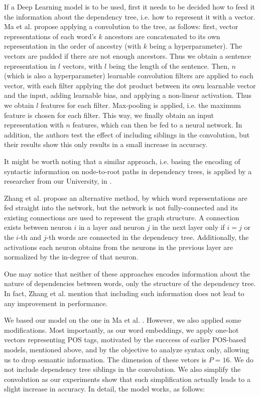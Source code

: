 \documentclass[twocolumn]{article}
\begin{document}
If a Deep Learning model is to be used, first it needs to be decided how to feed it the information about the dependency tree, i.e. how to represent it with a vector. Ma et al. \cite{ancestors} propose applying a convolution to the tree, as follows: first, vector representations of each word's $k$ ancestors are concatenated to its own representation in the order of ancestry (with $k$ being a hyperparameter). The vectors are padded if there are not enough ancestors. Thus we obtain a sentence representation in $l$ vectors, with $l$ being the length of the sentence. Then, $n$ (which is also a hyperparameter) learnable convolution filters are applied to each vector, with each filter applying the dot product between its own learnable vector and the input, adding learnable bias, and applying a non-linear activation. Thus we obtain $l$ features for each filter. Max-pooling is applied, i.e. the maximum feature is chosen for each filter. This way, we finally obtain an input representation with $n$ features, which can then be fed to a neural network. In addition, the authors test the effect of including siblings in the convolution, but their results show this only results in a small increase in accuracy.

It might be worth noting that a similar approach, i.e. basing the encoding of syntactic information on node-to-root paths in dependency trees, is applied by a researcher from our University, in \cite{kgan}.

Zhang et al. \cite{adjacency} propose an alternative method, by which word representations are fed straight into the network, but the network is not fully-connected and its existing connections are used to represent the graph structure. A connection exists between neuron $i$ in a layer and neuron $j$ in the next layer only if $i=j$ or the $i$-th and $j$-th words are connected in the dependency tree. Additionally, the activations each neuron obtains from the neurons in the previous layer are normalized by the in-degree of that neuron.

One may notice that neither of these approaches encodes information about the nature of dependencies between words, only the structure of the dependency tree. In fact, Zhang et al. mention that including such information does not lead to any improvement in performance.

We based our model on the one in Ma et al. \cite{ancestors}. However, we also applied some modifications. Most importantly, as our word embeddings, we apply one-hot vectors representing POS tags, motivated by the succcess of earlier POS-based models, mentioned above, and by the objective to analyze syntax only, allowing us to drop semantic information. The dimension of these vetors is $P=16$. We do not include dependency tree siblings in the convolution. We also simplify the convolution as our experiments show that such simplification actually leads to a slight increase in accuracy. In detail, the model works, as follows:
\end{document}
